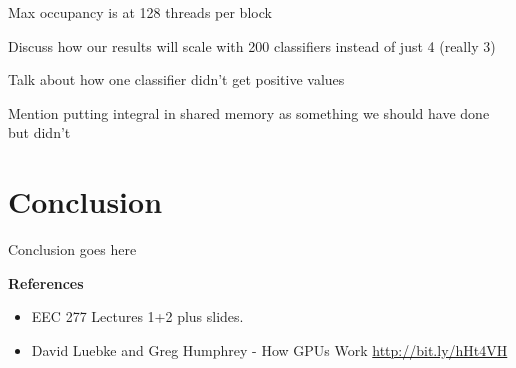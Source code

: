 \documentclass[12pt] {article}
\begin{document}
Max occupancy is at 128 threads per block

Discuss how our results will scale with 200 classifiers instead of just 4 (really 3)

Talk about how one classifier didn't get positive values

Mention putting integral in shared memory as something we should have done but didn't

\section{Conclusion}
Conclusion goes here

\clearpage
\large \bf {References}
\medskip

\normalsize
\begin{itemize}
	
	\item EEC 277 Lectures 1+2 plus slides.
	
	\item David Luebke and Greg Humphrey - How GPUs Work \newline
	\url {http://bit.ly/hHt4VH}

\end{itemize}
\end{document}
